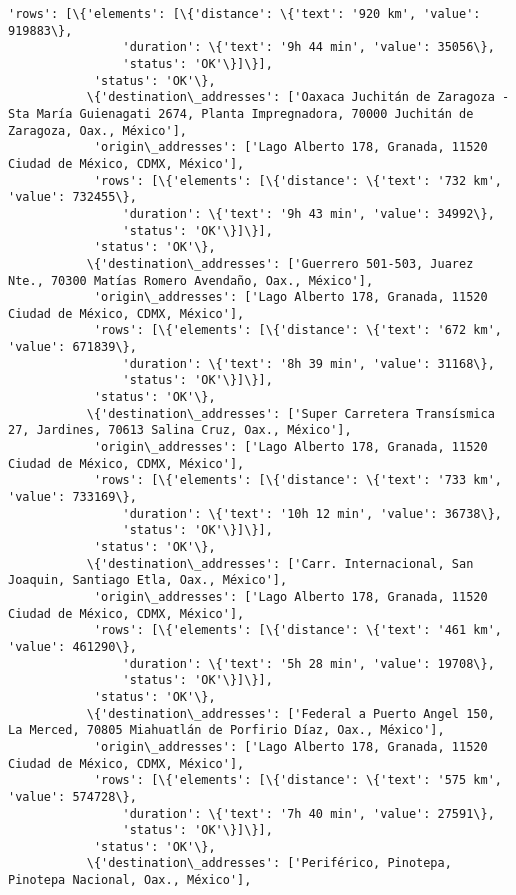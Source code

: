\documentclass[11pt]{article}
\begin{document}
\begin{Verbatim}[commandchars=\\\{\}]
            'rows': [\{'elements': [\{'distance': \{'text': '920 km', 'value': 919883\},
                'duration': \{'text': '9h 44 min', 'value': 35056\},
                'status': 'OK'\}]\}],
            'status': 'OK'\},
           \{'destination\_addresses': ['Oaxaca Juchitán de Zaragoza - Sta María Guienagati 2674, Planta Impregnadora, 70000 Juchitán de Zaragoza, Oax., México'],
            'origin\_addresses': ['Lago Alberto 178, Granada, 11520 Ciudad de México, CDMX, México'],
            'rows': [\{'elements': [\{'distance': \{'text': '732 km', 'value': 732455\},
                'duration': \{'text': '9h 43 min', 'value': 34992\},
                'status': 'OK'\}]\}],
            'status': 'OK'\},
           \{'destination\_addresses': ['Guerrero 501-503, Juarez Nte., 70300 Matías Romero Avendaño, Oax., México'],
            'origin\_addresses': ['Lago Alberto 178, Granada, 11520 Ciudad de México, CDMX, México'],
            'rows': [\{'elements': [\{'distance': \{'text': '672 km', 'value': 671839\},
                'duration': \{'text': '8h 39 min', 'value': 31168\},
                'status': 'OK'\}]\}],
            'status': 'OK'\},
           \{'destination\_addresses': ['Super Carretera Transísmica 27, Jardines, 70613 Salina Cruz, Oax., México'],
            'origin\_addresses': ['Lago Alberto 178, Granada, 11520 Ciudad de México, CDMX, México'],
            'rows': [\{'elements': [\{'distance': \{'text': '733 km', 'value': 733169\},
                'duration': \{'text': '10h 12 min', 'value': 36738\},
                'status': 'OK'\}]\}],
            'status': 'OK'\},
           \{'destination\_addresses': ['Carr. Internacional, San Joaquin, Santiago Etla, Oax., México'],
            'origin\_addresses': ['Lago Alberto 178, Granada, 11520 Ciudad de México, CDMX, México'],
            'rows': [\{'elements': [\{'distance': \{'text': '461 km', 'value': 461290\},
                'duration': \{'text': '5h 28 min', 'value': 19708\},
                'status': 'OK'\}]\}],
            'status': 'OK'\},
           \{'destination\_addresses': ['Federal a Puerto Angel 150, La Merced, 70805 Miahuatlán de Porfirio Díaz, Oax., México'],
            'origin\_addresses': ['Lago Alberto 178, Granada, 11520 Ciudad de México, CDMX, México'],
            'rows': [\{'elements': [\{'distance': \{'text': '575 km', 'value': 574728\},
                'duration': \{'text': '7h 40 min', 'value': 27591\},
                'status': 'OK'\}]\}],
            'status': 'OK'\},
           \{'destination\_addresses': ['Periférico, Pinotepa, Pinotepa Nacional, Oax., México'],

\end{Verbatim}
\end{document}
